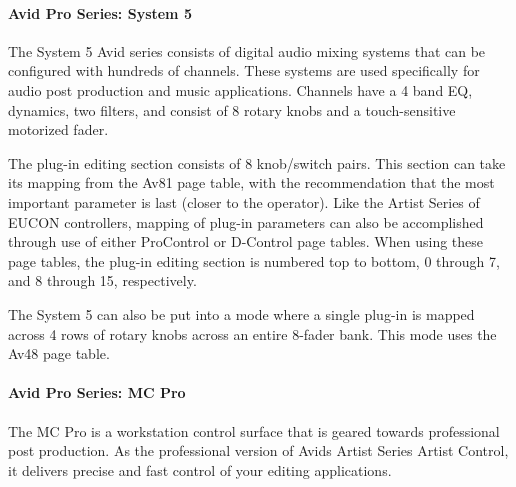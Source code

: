 \hypertarget{a00833_subsubsection__avid_pro_series_system_5_}{}\paragraph{Avid Pro Series\+: System 5}\label{a00833_subsubsection__avid_pro_series_system_5_}
 The System 5 Avid series consists of digital audio mixing systems that can be configured with hundreds of channels. These systems are used specifically for audio post production and music applications. Channels have a 4 band EQ, dynamics, two filters, and consist of 8 rotary knobs and a touch-\/sensitive motorized fader.

The plug-\/in editing section consists of 8 knob/switch pairs. This section can take it\textquotesingle{}s mapping from the {\ttfamily Av81} page table, with the recommendation that the most important parameter is last (closer to the operator). Like the Artist Series of E\+U\+C\+ON controllers, mapping of plug-\/in parameters can also be accomplished through use of either Pro\+Control or D-\/\+Control page tables. When using these page tables, the plug-\/in editing section is numbered top to bottom, 0 through 7, and 8 through 15, respectively.

The System 5 can also be put into a mode where a single plug-\/in is mapped across 4 rows of rotary knobs across an entire 8-\/fader bank. This mode uses the Av48 page table.

\hypertarget{a00833_subsubsection__avid_pro_series_mc_pro_}{}\paragraph{Avid Pro Series\+: M\+C Pro}\label{a00833_subsubsection__avid_pro_series_mc_pro_}
 The MC Pro is a workstation control surface that is geared towards professional post production. As the professional version of Avid\textquotesingle{}s Artist Series Artist Control, it delivers precise and fast control of your editing applications.

